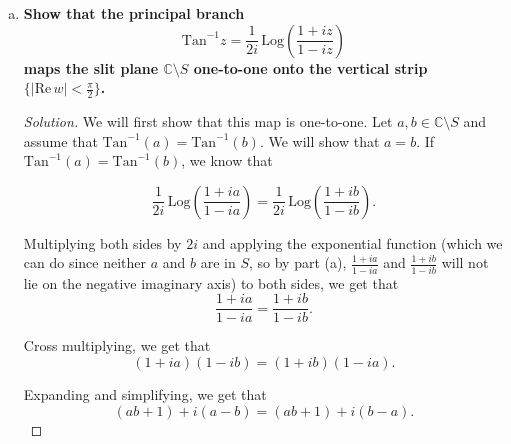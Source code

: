 \documentclass[11pt]{article}
\newcommand{\C}{\mathbb{C}}
\newenvironment{solution}
  {\renewcommand\qedsymbol{$\blacksquare$}\begin{proof}[Solution]}
  {\end{proof}}
\theoremstyle{definition}
\begin{document}
\begin{enumerate}[a)]
\begin{solution}
By definition, if $z \in S$, then $z=ci$ for some $c \in \mathbb{R}$ satisfying $c \in (-\infty, -1) \cup [1, \infty).$ Plugging this value for $z$ into $\frac{1+iz}{1-iz}$, we get that
\[ \frac{1+iz}{1-iz} = \frac{1+i(ci)}{1-i(ci)} = \frac{1-c}{1+c}\]


Note that when $c=1$, this expression evaluates to $0$. On the other hand, the expression $\frac{1-c}{1+c}$ is positive if and only if both $1-c$ and $1+c$ are negative,
or if both $1-c$ and $1+c$ are positive. Note that the former case cannot occur as if $1-c < 0$, then $c>1$ which would make $1+c$ positive. Similarly, the latter case can only occur when $-1 < c < 1$, which violates
the condition that $c \in (-\infty, -1) \cup [1, \infty).$ \\

Thus, if $z \in S$, then $\frac{1+iz}{1-iz}$ must lie on the negative real axis $(-\infty, 0].$ \\

Since we have proved both directions of the if and only if, we know that $\frac{1+iz}{1-iz}$ lies on the negative real axis $(-\infty, 0]$ if and only if $z \in S$. \end{solution}
\item \textbf{Show that the principal branch 
\[ \mathrm{Tan}^{-1} z = \frac{1}{2i} \, \mathrm{Log} \left( \frac{1+iz}{1-iz} \right) \]
maps the slit plane $\C \setminus S$ one-to-one onto the vertical strip $\{ | \mathrm{Re} \, w | < \frac{\pi}{2}\}$.}

\begin{solution}
We will first show that this map is one-to-one. Let $a, b \in \C \setminus S$ and assume that $\mathrm{Tan}^{-1}(a) = \mathrm{Tan}^{-1}(b)$. We will show that $a = b$. If $\mathrm{Tan}^{-1}(a) = \mathrm{Tan}^{-1}(b)$, we know that

\[\frac{1}{2i} \, \mathrm{Log} \left( \frac{1+ia}{1-ia} \right) = \frac{1}{2i} \, \mathrm{Log} \left( \frac{1+ib}{1-ib} \right). \]

Multiplying both sides by $2i$ and applying the exponential function (which we can do since neither $a$ and $b$ are in $S$, so by part (a), $\frac{1+ia}{1-ia}$ and $\frac{1+ib}{1-ib}$ will not lie on the negative imaginary axis) to both sides, we get that
\[ \frac{1+ia}{1-ia} = \frac{1+ib}{1-ib}.\]

Cross multiplying, we get that \[ (1+ia)(1-ib) = (1+ib)(1-ia). \]

Expanding and simplifying, we get that
\[ (ab + 1) + i(a-b) = (ab + 1) + i(b-a). \]


\end{solution}
\end{enumerate}
\end{document}
